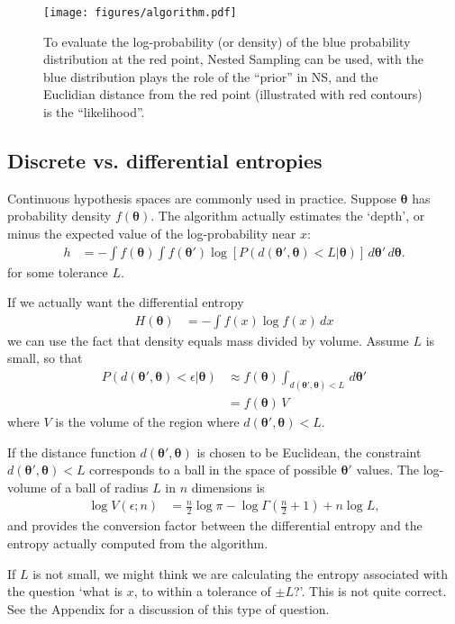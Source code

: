 \documentclass[entropy,article,accept,oneauthor,pdftex,10pt,a4paper]{mdpi}
\newcommand{\x}{\boldsymbol{\theta}}
\begin{document}
\begin{figure}[!ht]
\centering
\texttt{[image: figures/algorithm.pdf]}
\caption{To evaluate the log-probability (or density) of the blue
probability distribution at the red point, Nested Sampling can be used,
with the blue distribution plays the role of the ``prior'' in NS, and the
Euclidian distance from the red point (illustrated with red contours)
is the ``likelihood''.\label{fig:algorithm}}
\end{figure}

\subsection{Discrete vs. differential entropies}

Continuous hypothesis spaces are commonly used in practice. Suppose
$\x$ has probability density $f(\x)$. The algorithm actually estimates
the `depth', or minus the expected value of the log-probability near $x$:
\begin{align}
h &= -\int f(\x) \int f(\x')
            \log \left[ P(d(\x', \x) < L | \x) \right]
                        \, d\x' \, d\x.
\end{align}
for some tolerance $L$.

If we actually want the differential
entropy
\begin{align}
H(\x) &= -\int f(x) \log f(x) \, dx
\end{align}
we can use the fact that density equals mass divided
by volume. Assume $L$ is small, so that
\begin{align}
P(d(\x', \x) < \epsilon | \x)
    &\approx
    f(\x) \int_{d(\x', \x) < L} \, d\x'\\
    &= f(\x) \, V
\end{align}
where $V$ is the volume of the region where $d(\x', \x) < L$.

If the distance function $d(\x', \x)$ is chosen to be Euclidean,
the constraint $d(\x', \x) < L$ corresponds to a ball in the space
of possible $\x'$ values.
The log-volume of a ball of radius $L$ in $n$ dimensions is
\begin{align}
\log V(\epsilon; n) &= \frac{n}{2}\log \pi
                        - \log \Gamma\left(\frac{n}{2} + 1\right)
                        + n \log L,
\end{align}
and provides the conversion factor between the differential entropy and
the entropy actually computed from the algorithm.

If $L$ is not small, we might think we are calculating the entropy associated
with the question `what is $x$, to within a tolerance of $\pm L$?'.
This is not quite correct. See the Appendix for a discussion of this
type of question.
\end{document}
